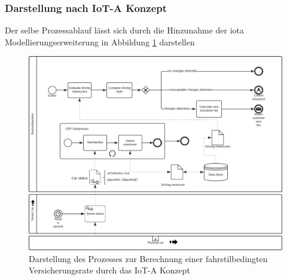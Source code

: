\documentclass[a4paper, 12pt, twoside, headsepline=true]{scrartcl} %
\begin{document}
\subsubsection{Darstellung nach IoT-A Konzept}
Der selbe Prozessablauf lässt sich durch die Hinzunahme der \ac{iota} Modellierungserweiterung in Abbildung \ref{fig:iotausecase} darstellen
\begin{figure}[H]
	\includegraphics[height=12.5 cm,keepaspectratio,center]{figures/IoTAUseCase}
	\caption{Darstellung des Prozesses zur Berechnung einer fahrstilbedingten Versicherungsrate durch das IoT-A Konzept}
	\label{fig:iotausecase}
\end{figure} 
\end{document}
